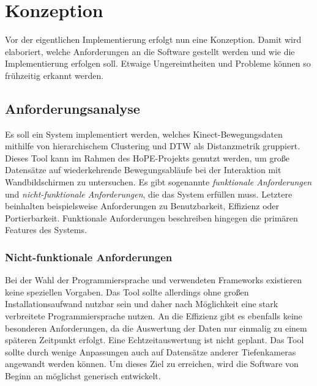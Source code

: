 \chapter{Konzeption}
\label{chapter4}
Vor der eigentlichen Implementierung erfolgt nun eine Konzeption.
Damit wird elaboriert, welche Anforderungen an die Software gestellt werden
und wie die Implementierung erfolgen soll.
Etwaige Ungereimtheiten und Probleme können so frühzeitig erkannt werden.


\section{Anforderungsanalyse}
\label{4-Anforderungsanalyse}
Es soll ein System implementiert werden,
welches Kinect-Bewegungsdaten mithilfe von hierarchischem Clustering
und \ac{DTW} als Distanzmetrik gruppiert.
Dieses Tool kann im Rahmen des HoPE-Projekts genutzt werden,
um große Datensätze auf wiederkehrende Bewegungsabläufe bei der Interaktion mit Wandbildschirmen
zu untersuchen.
Es gibt sogenannte \emph{funktionale Anforderungen} und \emph{nicht-funktionale Anforderungen},
die das System erfüllen muss.
Letztere beinhalten beispielsweise Anforderungen zu Benutzbarkeit, Effizienz oder Portierbarkeit.
Funktionale Anforderungen beschreiben hingegen die primären Features des Systems.

\subsection{Nicht-funktionale Anforderungen}
\label{4-NichtFunktionaleAnforderungen}
Bei der Wahl der Programmiersprache und verwendeten Frameworks
existieren keine speziellen Vorgaben.
Das Tool sollte allerdings ohne großen Installationsaufwand nutzbar sein
und daher nach Möglichkeit eine stark verbreitete Programmiersprache nutzen.
An die Effizienz gibt es ebenfalls keine besonderen Anforderungen,
da die Auswertung der Daten nur einmalig zu einem späteren Zeitpunkt erfolgt.
Eine Echtzeitauswertung ist nicht geplant.
Das Tool sollte durch wenige Anpassungen auch auf Datensätze anderer Tiefenkameras angewandt werden können.
Um dieses Ziel zu erreichen, wird die Software von Beginn an möglichst generisch entwickelt.

